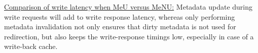 
\underline{Comparison of write latency when MeU versus MeNU:}
Metadata update during write requests
will add to write response latency, whereas only performing metadata
invalidation not only ensures that dirty metadata is not used for
redirection, but also keeps the write-response timings low, especially
in case of a write-back cache.

